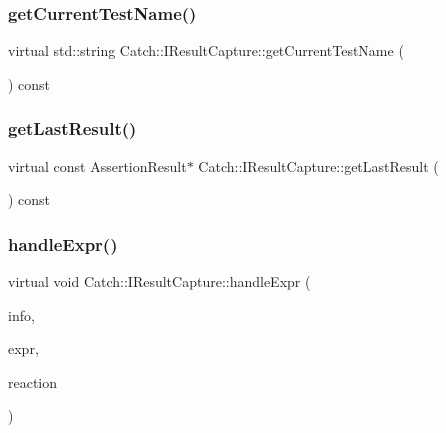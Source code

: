 \mbox{\label{struct_catch_1_1_i_result_capture_aea1617f4a84cc648246aa3ed6918b5bf}} 
\subsubsection{getCurrentTestName()}
{\footnotesize\ttfamily virtual std\+::string Catch\+::\+I\+Result\+Capture\+::get\+Current\+Test\+Name (\begin{DoxyParamCaption}{ }\end{DoxyParamCaption}) const\hspace{0.3cm}{\ttfamily [pure virtual]}}

\mbox{\label{struct_catch_1_1_i_result_capture_ab18872c89fab97405a56e9c6a4919736}} 
\subsubsection{getLastResult()}
{\footnotesize\ttfamily virtual const Assertion\+Result$\ast$ Catch\+::\+I\+Result\+Capture\+::get\+Last\+Result (\begin{DoxyParamCaption}{ }\end{DoxyParamCaption}) const\hspace{0.3cm}{\ttfamily [pure virtual]}}

\mbox{\label{struct_catch_1_1_i_result_capture_a59a2b05391e464954575d2afb6d5d607}} 
\subsubsection{handleExpr()}
{\footnotesize\ttfamily virtual void Catch\+::\+I\+Result\+Capture\+::handle\+Expr (\begin{DoxyParamCaption}\item[{\textbf{ Assertion\+Info} const \&}]{info,  }\item[{\textbf{ I\+Transient\+Expression} const \&}]{expr,  }\item[{\textbf{ Assertion\+Reaction} \&}]{reaction }\end{DoxyParamCaption})\hspace{0.3cm}{\ttfamily [pure virtual]}}

